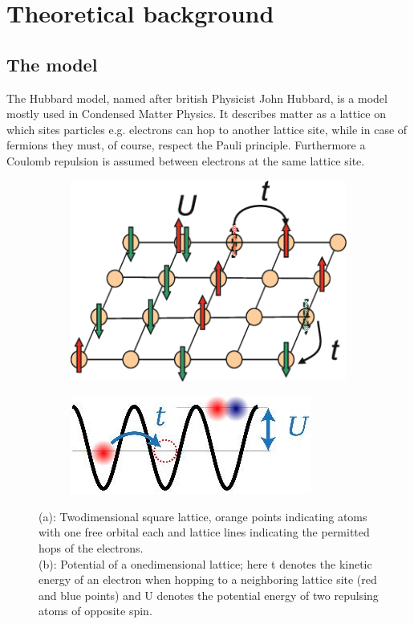 

\section{Theoretical background}
\subsection{The model}
The Hubbard model, named after british Physicist John Hubbard, is a model mostly used in Condensed Matter Physics. It describes matter as a lattice on which sites particles e.g. electrons can hop to another lattice site, while in case of fermions they must, of course, respect the Pauli principle. Furthermore a Coulomb repulsion is assumed between electrons at the same lattice site.
\begin{figure}[h!]
	\begin{subfigure}{.5 \textwidth}
		\centering
		\includegraphics[width=0.8\linewidth]{pic2}
		\caption{\cite{Hubbard}}
		\label{fig:pic2}
	\end{subfigure}
	\begin{subfigure}{.5 \textwidth}
		\centering
		\includegraphics[width=0.8\linewidth]{pic1}
		\caption{\cite{Hubbard2}}
		\label{fig:pic1}
	\end{subfigure}
	\caption[Illustration of the Hubbard model]{(a): Twodimensional square lattice, orange points indicating atoms with one free orbital each and lattice lines indicating the permitted hops of the electrons. \\(b): Potential of a onedimensional lattice; here t denotes the kinetic energy of an electron when hopping to a neighboring lattice site (red and blue points) and U denotes the potential energy of two repulsing atoms of opposite spin.}
	\label{HubbardFigs}
\end{figure}
